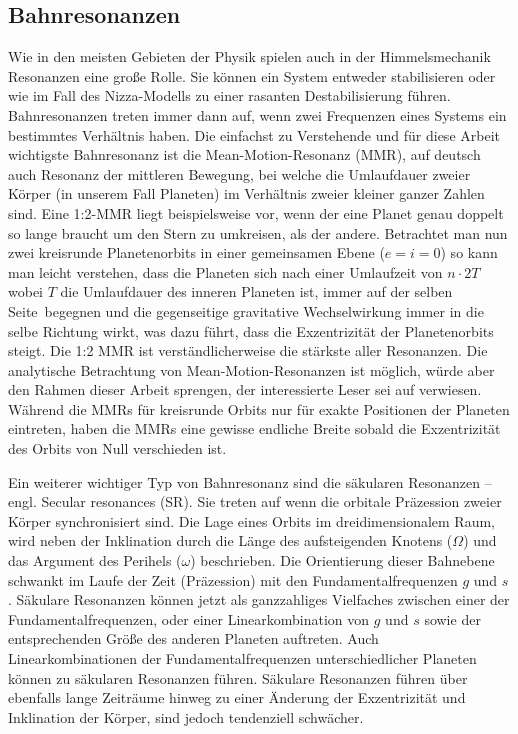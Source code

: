 \documentclass[12pt,a4paper,twoside]{article}
\renewcommand{\cite}{\citep}
\begin{document}
\subsection{Bahnresonanzen}
Wie in den meisten Gebieten der Physik spielen auch in der Himmelsmechanik Resonanzen eine große Rolle. Sie können ein System entweder stabilisieren oder wie im Fall des Nizza-Modells zu einer rasanten Destabilisierung führen.
Bahnresonanzen treten immer dann auf, wenn zwei Frequenzen eines Systems ein bestimmtes Verhältnis haben.
Die einfachst zu Verstehende und für diese Arbeit wichtigste Bahnresonanz ist die Mean-Motion-Resonanz (MMR), auf deutsch auch Resonanz der mittleren Bewegung, bei welche die Umlaufdauer zweier Körper (in unserem Fall Planeten) im Verhältnis zweier kleiner ganzer Zahlen sind.
Eine 1:2-MMR liegt beispielsweise vor, wenn der eine Planet genau doppelt so lange braucht um den Stern zu umkreisen, als der andere. Betrachtet man nun zwei kreisrunde Planetenorbits in einer gemeinsamen Ebene ($e=i=0$) so kann man leicht verstehen, dass die Planeten sich nach einer Umlaufzeit von $n\cdot 2T$ wobei $T$ die Umlaufdauer des inneren Planeten ist, immer auf der \glqq selben Seite\grqq\ begegnen und die gegenseitige gravitative Wechselwirkung immer in die selbe Richtung wirkt, was dazu führt, dass die Exzentrizität der Planetenorbits steigt. Die 1:2 MMR ist verständlicherweise die stärkste aller Resonanzen.
Die analytische Betrachtung von Mean-Motion-Resonanzen ist möglich, würde aber den Rahmen dieser Arbeit sprengen, der interessierte Leser sei auf \cite{Dvorak2005,Murray2010} verwiesen. %
Während die MMRs für kreisrunde Orbits nur für exakte Positionen der Planeten eintreten, haben die MMRs eine gewisse endliche Breite sobald die Exzentrizität des Orbits von Null verschieden ist.

Ein weiterer wichtiger Typ von Bahnresonanz sind die säkularen Resonanzen – engl. Secular resonances (SR). Sie treten auf wenn die orbitale Präzession zweier Körper synchronisiert sind.
Die Lage eines Orbits im dreidimensionalem Raum, wird neben der Inklination durch die Länge des aufsteigenden Knotens ($\Omega$) und das Argument des Perihels ($\omega$) beschrieben. Die Orientierung dieser Bahnebene schwankt im Laufe der Zeit (Präzession) mit den Fundamentalfrequenzen $g$ und $s$. Säkulare Resonanzen können jetzt als ganzzahliges Vielfaches zwischen einer der Fundamentalfrequenzen, oder einer Linearkombination von $g$ und $s$ sowie der entsprechenden Größe des anderen Planeten auftreten. Auch Linearkombinationen der Fundamentalfrequenzen unterschiedlicher Planeten können zu säkularen Resonanzen führen.
Säkulare Resonanzen führen über ebenfalls lange Zeiträume hinweg zu einer Änderung der Exzentrizität und Inklination der Körper, sind jedoch tendenziell schwächer.
\end{document}
